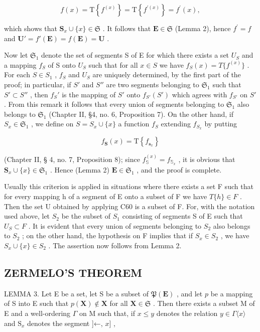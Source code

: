 \[
f (x) = \mathrm{T} \left\{f ^ {(x)} \right\} = \mathrm{T} \left\{f ^ {\prime (x)} \right\} = f ^ {\prime} (x),
\]

which shows that \(\mathbf{S}_x\cup \{x\} \in \mathfrak{S}\) . It follows that \(\mathbf{E}\in \mathfrak{S}\) (Lemma 2), hence \(f^{\prime} = f\) and \(\mathbf{U}' = f'(\mathbf{E}) = f(\mathbf{E}) = \mathbf{U}\) .

Now let \(\mathfrak{S}_1\) denote the set of segments S of E for which there exists a set \(U_S\) and a mapping \(f_S\) of S onto \(U_S\) such that for all \(x \in S\) we have \(f_S(x) = T \{ f^{(x)} \}\) . For each \(S \in S_1\) , \(f_S\) and \(U_S\) are uniquely determined, by the first part of the proof; in particular, if \(S'\) and \(S''\) are two segments belonging to \(\mathfrak{S}_1\) such that \(S' \subset S''\) , then \(f_S'\) is the mapping of \(S'\) onto \(f_{S'}(S')\) which agrees with \(f_{S'}\) on \(S'\) . From this remark it follows that every union of segments belonging to \(\mathfrak{S}_1\) also belongs to \(\mathfrak{S}_1\) (Chapter II, §4, no. 6, Proposition 7). On the other hand, if \(S_x \in \mathfrak{S}_1\) , we define on \(S = S_x \cup \{x\}\) a function \(f_S\) extending \(f_{S_x}\) by putting

\[
f _ {\mathbf {S}} (x) = \mathrm{T} \left\{f _ {\mathbf {s} _ {x}} \right\}
\]

(Chapter II, § 4, no. 7, Proposition 8); since \(f_{\mathbb{S}}^{(x)} = f_{\mathbb{S}_x}\) , it is obvious that \(\mathbf{S}_x \cup \{x\} \in \mathfrak{S}_1\) . Hence (Lemma 2) \(\mathbf{E} \in \mathfrak{S}_1\) , and the proof is complete.

Usually this criterion is applied in situations where there exists a set F such that for every mapping h of a segment of E onto a subset of F we have \(T\{h\}\in F\) . Then the set U obtained by applying C60 is a subset of F. For, with the notation used above, let \(S_{2}\) be the subset of \(S_{1}\) consisting of segments S of E such that \(U_{S}\subset F\) . It is evident that every union of segments belonging to \(S_{2}\) also belongs to \(S_{2}\) ; on the other hand, the hypothesis on F implies that if \(S_{x}\in S_{2}\) , we have \(S_{x}\cup\{x\}\in S_{2}\) . The assertion now follows from Lemma 2.

\subsection{ZERMELO'S THEOREM}

LEMMA 3. Let E be a set, let S be a subset of \(\mathfrak{P}(\mathbf{E})\) , and let \(p\) be a mapping of S into E such that \(p(\mathbf{X}) \notin \mathbf{X}\) for all \(\mathbf{X} \in \mathfrak{S}\) . Then there exists a subset M of E and a well-ordering \(\Gamma\) on M such that, if \(x \leqslant y\) denotes the relation \(y \in \Gamma\langle x \rangle\) and \(\mathrm{S}_x\) denotes the segment {]}←, \(x]\) ,

